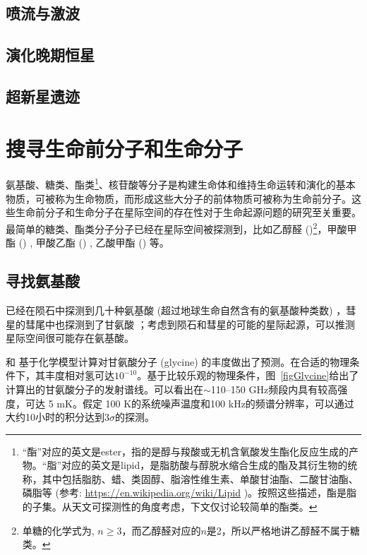 \documentclass[a4paper]{article}
\newcommand{\reffig}[1]{图~\ref{#1}}
\begin{document}
\subsection{喷流与激波}

\subsection{演化晚期恒星}

\subsection{超新星遗迹}

\section{搜寻生命前分子和生命分子}

氨基酸、糖类、酯类\footnote{“酯”对应的英文是ester，指的是醇与羧酸或无机含氧酸发生酯化反应生成的产物。“脂”对应的英文是lipid，是脂肪酸与醇脱水缩合生成的酯及其衍生物的统称，其中包括脂肪、蜡、类固醇、脂溶性维生素、单酸甘油酯、二酸甘油酯、磷脂等 (参考: \url{https://en.wikipedia.org/wiki/Lipid}%
)。按照这些描述，酯是脂的子集。从天文可探测性的角度考虑，下文仅讨论较简单的酯类。}、核苷酸等分子是构建生命体和维持生命运转和演化的基本物质，可被称为生命物质，而形成这些大分子的前体物质可被称为生命前分子。这些生命前分子和生命分子在星际空间的存在性对于生命起源问题的研究至关重要。最简单的糖类、酯类分子分子已经在星际空间被探测到，比如乙醇醛 ()\footnote{单糖的化学式为, $n\ge3$，而乙醇醛对应的$n$是2，所以严格地讲乙醇醛不属于糖类。}\citep{Hollis2000,Jorgensen2012}，甲酸甲酯 () \citep{Sakai2006}, 甲酸乙酯 () \citep{Belloche2009}, 乙酸甲酯 () \citep{Tercero2013} 等。

\subsection{寻找氨基酸}
已经在陨石中探测到几十种氨基酸 (超过地球生命自然含有的氨基酸种类数) \citep{Kvenvolden1970,Schmitt2010}，彗星的彗尾中也探测到了甘氨酸 \citep{Altwegg2016}；考虑到陨石和彗星的可能的星际起源，可以推测星际空间很可能存在氨基酸。

\citet{Garrod2013} 和 \citet{Suzuki2018}基于化学模型计算对甘氨酸分子 (glycine) 的丰度做出了预测。在合适的物理条件下，其丰度相对氢可达$10^{-10}$。基于比较乐观的物理条件，\reffig{figGlycine}给出了计算出的甘氨酸分子的发射谱线。可以看出在$\sim$110--150 GHz频段内具有较高强度，可达 5 mK。假定 100 K的系统噪声温度和100 kHz的频谱分辨率，可以通过大约10小时的积分达到$3\sigma$的探测。
\end{document}
